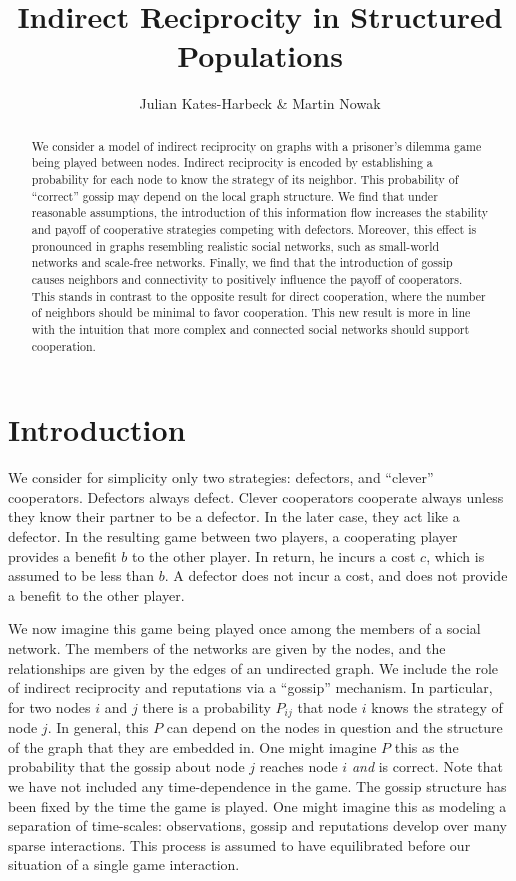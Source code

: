 \documentclass{article}
\title{Indirect Reciprocity in Structured Populations}
\author{Julian Kates-Harbeck \& Martin Nowak}
\renewcommand{\=}[1]{\stackrel{#1}{=}} %
\begin{document}
    
    
    \maketitle
    

    \begin{abstract}


    We consider a model of indirect reciprocity on graphs with a prisoner's
dilemma game being played between nodes. Indirect reciprocity is encoded
by establishing a probability for each node to know the strategy of its
neighbor. This probability of ``correct'' gossip may depend on the local
graph structure. We find that under reasonable assumptions, the
introduction of this information flow increases the stability and payoff
of cooperative strategies competing with defectors. Moreover, this
effect is pronounced in graphs resembling realistic social networks,
such as small-world networks and scale-free networks. Finally, we find
that the introduction of gossip causes neighbors and connectivity to
positively influence the payoff of cooperators. This stands in contrast
to the opposite result for direct cooperation, where the number of
neighbors should be minimal to favor cooperation. This new result is
more in line with the intuition that more complex and connected social
networks should support cooperation.

\end{abstract}

\section{Introduction}


We consider for simplicity only two strategies: defectors, and ``clever'' cooperators. Defectors always defect. Clever cooperators cooperate always unless they know their partner to be a defector. In the later case, they act like a defector. In the resulting game between two players, a cooperating player provides a benefit $b$ to the other player. In return, he incurs a cost $c$, which is assumed to be less than $b$. A defector does not incur a cost, and does not provide a benefit to the other player.

We now imagine this game being played once among the members of a social network. The members of the networks are given by the nodes, and the relationships are given by the edges of an undirected graph. We include the role of indirect reciprocity and reputations via a ``gossip'' mechanism. In particular, for two nodes $i$ and $j$ there is a probability $P_{ij}$ that node $i$ knows the strategy of node $j$. In general, this $P$ can depend on the nodes in question and the structure of the graph that they are embedded in. One might imagine $P$ this as the probability that the gossip about node $j$ reaches node $i$ \emph{and} is correct. Note that we have not included any time-dependence in the game. The gossip structure has been fixed by the time the game is played. One might imagine this as modeling a separation of time-scales: observations, gossip and reputations develop over many sparse interactions. This process is assumed to have equilibrated before our situation of a single game interaction.
\end{document}

